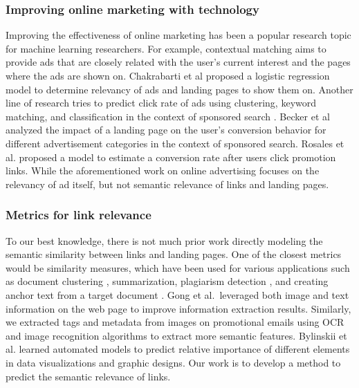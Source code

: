 \documentclass{sigchi}
\begin{document}
\subsubsection{Improving online marketing with technology}
Improving the effectiveness of online marketing has been a popular research topic for machine learning researchers. For example, contextual matching aims to provide ads that are closely related with the user's current interest and the pages where the ads are shown on. Chakrabarti et al\cite{chakrabarti2008contextual} proposed a logistic regression model to determine relevancy of ads and landing pages to show them on. Another line of research tries to predict click rate of ads using clustering, keyword matching, and classification in the context of sponsored search \cite{regelson2006predicting}. Becker et al \cite{Becker:2009:HAA:1645953.1645964} analyzed the impact of a landing page on the user's conversion behavior for different advertisement categories in the context of sponsored search. Rosales et al.\cite{Rosales:2012:PCM:2124295.2124333} proposed a model to estimate a conversion rate after users click promotion links. While the aforementioned work on online advertising focuses on the relevancy of ad itself, but not semantic relevance of links and landing pages. 

\subsubsection{Metrics for link relevance}
To our best knowledge, there is not much prior work directly modeling the semantic similarity between links and landing pages. One of the closest metrics would be similarity measures, which have been used for various applications such as document clustering \cite{huang2008similarity}, summarization, plagiarism detection \cite{lukashenko2007computer}, and creating anchor text from a target document  \cite{rebervsek-verlic:2013:EMNLP}. Gong et al.\,\cite{Gong:2017:MLW:3123266.3123296} leveraged both image and text information on the web page to improve information extraction results. Similarly, we extracted tags and metadata from images on promotional emails using OCR and image recognition algorithms to extract more semantic features. Bylinskii et al. \cite{Bylinskii:2017:LVI:3126594.3126653} learned automated models to predict relative importance of different elements in data visualizations and graphic designs. Our work is to develop a method to predict the semantic relevance of links. 
\end{document}
